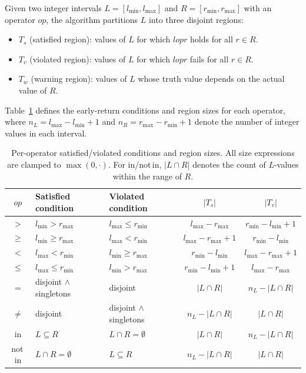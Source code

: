\documentclass[pdflatex,sn-basic]{sn-jnl}%
\theoremstyle{thmstyleone}%
\theoremstyle{thmstyletwo}%
\theoremstyle{thmstylethree}%
\begin{document}
Given two integer intervals $L = [l_{\min}, l_{\max}]$ and $R = [r_{\min}, r_{\max}]$ with an operator $op$, the algorithm partitions $L$ into three disjoint regions:
\begin{itemize}
    \item $T_s$ (satisfied region): values of $L$ for which $l \mathrel{op} r$ holds for all $r \in R$.
    \item $T_v$ (violated region): values of $L$ for which $l \mathrel{op} r$ fails for all $r \in R$.
    \item $T_w$ (warning region): values of $L$ whose truth value depends on the actual value of $R$.
\end{itemize}

Table~\ref{tab:op-formulas} defines the early-return conditions and region sizes for each operator, where $n_L = l_{\max} - l_{\min} + 1$ and $n_R = r_{\max} - r_{\min} + 1$ denote the number of integer values in each interval.

\begin{table}[t]
\centering
\caption{Per-operator satisfied/violated conditions and region sizes. All size expressions are clamped to $\max(0, \cdot)$. For in/not\,in, $|L \cap R|$ denotes the count of $L$-values within the range of $R$.}
\label{tab:op-formulas}
\small
\begin{tabular}{cllcc}
\toprule
$op$ & Satisfied condition & Violated condition & $|T_s|$ & $|T_v|$ \\
\midrule
$>$    & $l_{\min} > r_{\max}$    & $l_{\max} \leq r_{\min}$  & $l_{\max} - r_{\max}$     & $r_{\min} - l_{\min} + 1$ \\
$\geq$ & $l_{\min} \geq r_{\max}$ & $l_{\max} < r_{\min}$     & $l_{\max} - r_{\max} + 1$ & $r_{\min} - l_{\min}$     \\
$<$    & $l_{\max} < r_{\min}$    & $l_{\min} \geq r_{\max}$  & $r_{\min} - l_{\min}$     & $l_{\max} - r_{\max} + 1$ \\
$\leq$ & $l_{\max} \leq r_{\min}$ & $l_{\min} > r_{\max}$     & $r_{\min} - l_{\min} + 1$ & $l_{\max} - r_{\max}$     \\
\midrule
$=$    & disjoint $\wedge$ singletons  & disjoint  & $|L \cap R|$ & $n_L - |L \cap R|$ \\
$\neq$ & disjoint  & disjoint $\wedge$ singletons  & $n_L - |L \cap R|$ & $|L \cap R|$ \\
\midrule
in     & $L \subseteq R$ & $L \cap R = \emptyset$ & $|L \cap R|$       & $n_L - |L \cap R|$ \\
not\,in & $L \cap R = \emptyset$ & $L \subseteq R$ & $n_L - |L \cap R|$ & $|L \cap R|$       \\
\bottomrule
\end{tabular}
\end{table}
\end{document}
